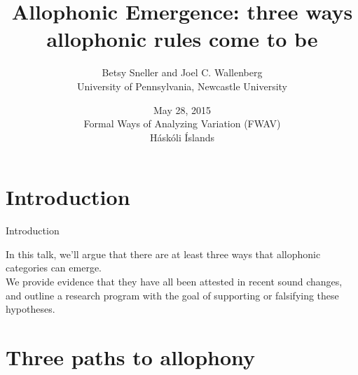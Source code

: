 \documentclass[hyperref={pdfpagelabels=false}]{beamer}
\title{Allophonic Emergence: three ways allophonic rules come to be}
\author{Betsy Sneller and Joel C. Wallenberg \\University of Pennsylvania, Newcastle University}
\institute{}
\date[]{May 28, 2015 \\ Formal Ways of Analyzing Variation (FWAV)\\ Háskóli Íslands}
\begin{document}
\begin{frame}[plain]
\titlepage
\end{frame}

\section{Introduction}
%
%			

\begin{frame}{Introduction}

In this talk, we'll argue that there are at least three ways that allophonic categories can emerge.\\
\vspace{5mm}
We provide evidence that they have all been attested in recent sound changes, and outline a research program with the goal of supporting or falsifying these hypotheses.

\end{frame}

\section[Outline]{}
\frame{\tableofcontents}

\section{Three paths to allophony}
\end{document}

